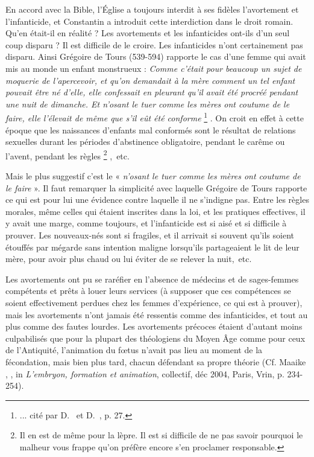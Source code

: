  En accord avec la Bible, l'Église a toujours interdit à ses fidèles l'avortement et l'infanticide, et Constantin a introduit cette interdiction dans le droit romain. Qu'en était-il en réalité ? Les avortements et les infanticides ont-ils d'un seul coup disparu ? Il est difficile de le croire. Les infanticides n'ont certainement pas disparu. Ainsi Grégoire de Tours (539-594) rapporte le cas d'une femme qui avait mis au monde un enfant monstrueux : \emph{Comme c'était pour beaucoup un sujet de moquerie de l'apercevoir, et qu'on demandait à la mère comment un tel enfant pouvait être né d'elle, elle confessait en pleurant qu'il avait été procréé pendant une nuit de dimanche. Et n'osant le tuer comme les mères ont coutume de le faire, elle l'élevait de même que s'il eût été conforme}%
\footnote{... cité par D.~ et D.~, p. 27.}%
. On croit en effet à cette époque que les naissances d'enfants mal conformés sont le résultat de relations sexuelles durant les périodes d'abstinence obligatoire, pendant le carême ou l'avent, pendant les règles%
\footnote{Il en est de même pour la lèpre. Il est si difficile de ne pas savoir pourquoi le malheur vous frappe qu'on préfère encore s'en proclamer responsable.}%
,~etc.

 Mais le plus suggestif c'est le « \emph{n'osant le tuer comme les mères ont coutume de le faire} ». Il faut remarquer la simplicité avec laquelle Grégoire de Tours rapporte ce qui est pour lui une évidence contre laquelle il ne s'indigne pas. Entre les règles morales, même celles qui étaient inscrites dans la loi, et les pratiques effectives, il y avait une marge, comme toujours, et l'infanticide est si aisé et si difficile à prouver. Les nouveaux-nés sont si fragiles, et il arrivait si souvent qu'ils soient étouffés par mégarde sans intention maligne lorsqu'ils partageaient le lit de leur mère, pour avoir plus chaud ou lui éviter de se relever la nuit,~etc. 

 Les avortements ont pu se raréfier en l'absence de médecins et de sages-femmes compétents et prêts à louer leurs services (à supposer que ces compétences se soient effectivement perdues chez les femmes d'expérience, ce qui est à prouver), mais les avortements n'ont jamais été ressentis comme des infanticides, et tout au plus comme des fautes lourdes. Les avortements précoces étaient d'autant moins culpabilisés que pour la plupart des théologiens du Moyen Âge comme pour ceux de l'Antiquité, l'animation du fœtus n'avait pas lieu au moment de la fécondation, mais bien plus tard, chacun défendant sa propre théorie (Cf. Maaike , , in \emph{L'embryon, formation et animation}, collectif, déc 2004, Paris, Vrin, p. 234-254). 

